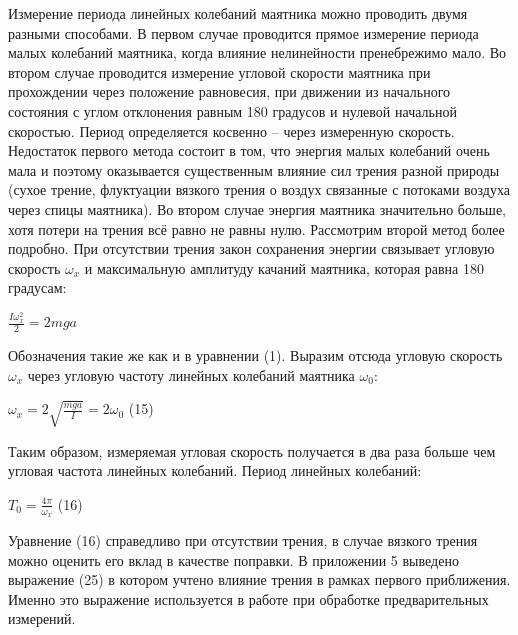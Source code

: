 \documentclass[a4paper]{article}
\begin{document}
Измерение периода линейных колебаний маятника можно проводить двумя разными способами. В первом случае проводится прямое измерение
периода малых колебаний маятника, когда влияние нелинейности пренебрежимо мало. Во втором случае проводится измерение угловой скорости
маятника при прохождении через положение равновесия, при движении
из начального состояния с углом отклонения равным 180 градусов и нулевой начальной скоростью. Период определяется косвенно – через измеренную скорость. Недостаток первого метода состоит в том, что энергия малых колебаний очень мала и поэтому оказывается существенным
влияние сил трения разной природы (сухое трение, флуктуации вязкого
трения о воздух связанные с потоками воздуха через спицы маятника).
Во втором случае энергия маятника значительно больше, хотя потери на
трения всё равно не равны нулю. Рассмотрим второй метод более подробно. При отсутствии трения закон сохранения энергии связывает угловую
скорость $\omega_x$ и максимальную амплитуду качаний маятника, которая равна 180 градусам:
\begin{center}$\frac{I\omega_x^2}{2}=2mga$\end{center}
Обозначения такие же как и в уравнении (1). Выразим отсюда угловую
скорость $\omega_x$ через угловую частоту линейных колебаний маятника $\omega_0$:
\begin{center}$\omega_x=2\sqrt{\frac{mga}{I}}=2\omega_0$ (15)\end{center}
Таким образом, измеряемая угловая скорость получается в два раза
больше чем угловая частота линейных колебаний. Период линейных колебаний:
\begin{center}$T_0=\frac{4\pi}{\omega_x}$ (16)\end{center}
Уравнение (16) справедливо при отсутствии трения, в случае вязкого
трения можно оценить его вклад в качестве поправки. В приложении
5 выведено выражение (25) в котором учтено влияние трения в рамках
первого приближения. Именно это выражение используется в работе при
обработке предварительных измерений.
\end{document}
